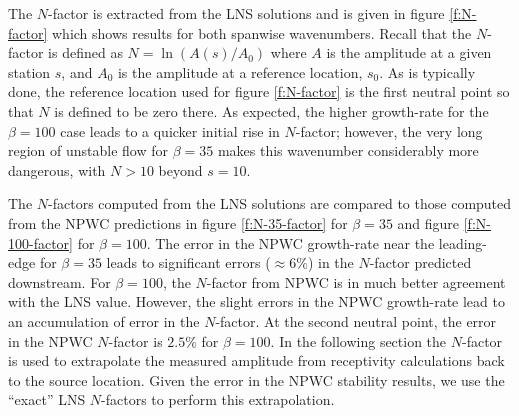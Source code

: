The $N$-factor is extracted from the LNS solutions and is given in figure
\ref{f:N-factor} which shows results for both spanwise wavenumbers.  Recall
that the $N$-factor is defined as $N = \ln({A(s)/A_0})$ where $A$ is the
amplitude at a given station $s$, and $A_0$ is the amplitude at a reference
location, $s_0$.  As is typically done, the reference location used for figure
\ref{f:N-factor} is the first neutral point so that $N$ is defined to be zero
there.  As expected, the higher growth-rate for the $\beta=100$ case leads to
a quicker initial rise in $N$-factor; however, the very long region of
unstable flow for $\beta=35$ makes this wavenumber considerably more dangerous,
with $N > 10$ beyond $s = 10$.

The $N$-factors computed from the LNS solutions are compared to those computed
from the NPWC predictions in figure \ref{f:N-35-factor} for $\beta=35$ and
figure \ref{f:N-100-factor} for $\beta=100$.  The error in the NPWC
growth-rate near the leading-edge for $\beta=35$ leads to significant errors
($\approx 6\%$) in the $N$-factor predicted downstream.  For $\beta=100$, the
$N$-factor from NPWC is in much better agreement with the LNS value.  However,
the slight errors in the NPWC growth-rate lead to an accumulation of error in
the $N$-factor.  At the second neutral point, the error in the NPWC $N$-factor
is $2.5\%$ for $\beta=100$.  In the following section the $N$-factor is used
to extrapolate the measured amplitude from receptivity calculations back to
the source location.  Given the error in the NPWC stability results, we use
the ``exact'' LNS $N$-factors to perform this extrapolation.

